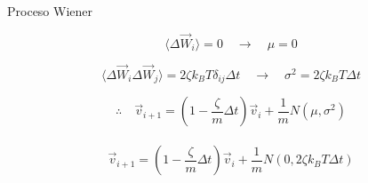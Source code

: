 \documentclass[10pt,a4papper]{article}
\begin{document}
\newpage
Proceso Wiener

\[\langle\Delta\vec W_i\rangle=0\quad\to\quad\mu=0\]

\[\langle\Delta\vec W_i\Delta\vec W_j\rangle=2\zeta k_BT\delta_{ij}\Delta t\quad\to\quad\sigma^2=2\zeta k_BT\Delta t\]

\[\therefore\quad\vec v_{i+1}=\left(1-\frac{\zeta}{m}\Delta t\right)\vec v_i+\frac{1}{m}N(\mu,\sigma^2)\]\\

\[\boxed{\vec v_{i+1}=\left(1-\frac{\zeta}{m}\Delta t\right)\vec v_i+\frac{1}{m}N(0,2\zeta k_BT\Delta t)}\]

\newpage

\newpage

\newpage

\newpage

\newpage

\newpage

\newpage

\newpage

\newpage

\newpage

\newpage

\newpage

\newpage

\newpage

\newpage

\newpage

\newpage

\newpage

\newpage

\newpage

\newpage

\newpage

\newpage

\newpage

\newpage

\newpage

\newpage

\newpage

\newpage

\newpage

\newpage

\newpage

\newpage

\newpage

\newpage

\newpage

\newpage

\newpage

\newpage
\end{document}
